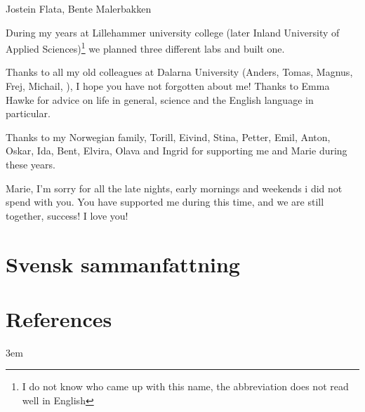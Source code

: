 \documentclass[twoside,10pt]{gihclass} %
\begin{document}
Jostein Flata, Bente Malerbakken

During my years at Lillehammer university college (later Inland University of Applied Sciences)\footnote{I do not know who came up with this name, the abbreviation does not read well in English} we planned three different labs and built one.

Thanks to all my old colleagues at Dalarna University (Anders, Tomas, Magnus, Frej, Michail, ), I hope you have not forgotten about me! Thanks to Emma Hawke for advice on life in general, science and the English language in particular.

Thanks to my Norwegian family, Torill, Eivind, Stina, Petter, Emil, Anton, Oskar, Ida, Bent, Elvira, Olava and Ingrid for supporting me and Marie during these years.

Marie, I'm sorry for all the late nights, early mornings and weekends i did not spend with you. You have supported me during this time, and we are still together, success! I love you!

\hypertarget{svensk-sammanfattning}{%
\chapter{Svensk sammanfattning}\label{svensk-sammanfattning}}

\backmatter

\hypertarget{references}{%
\chapter*{References}\label{references}}

\twocolumn

\setlength{\parskip}{4pt}

\rightskip3em

\footnotesize
\end{document}
